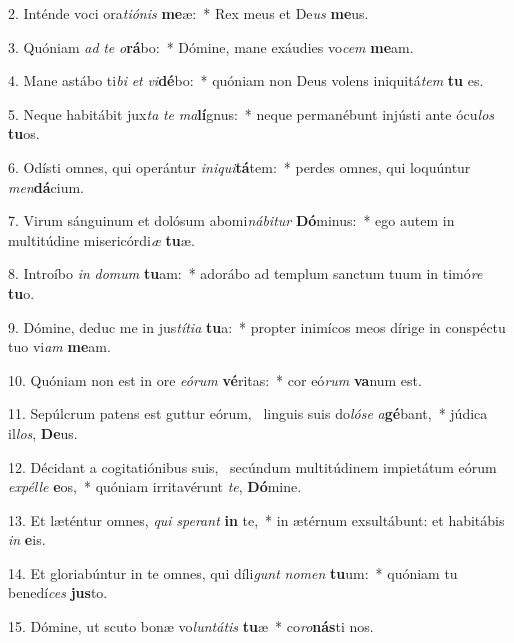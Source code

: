 2. Inténde voci ora\textit{ti}\textit{ó}\textit{nis} \textbf{me}æ:~*  Rex meus et De\textit{us} \textbf{me}us.\

3. Quóniam \textit{ad} \textit{te} \textit{o}\textbf{rá}bo:~*  Dómine, mane exáudies vo\textit{cem} \textbf{me}am.\

4. Mane astábo ti\textit{bi} \textit{et} \textit{vi}\textbf{dé}bo:~*  quóniam non Deus volens iniquitá\textit{tem} \textbf{tu} es.\

5. Neque habitábit jux\textit{ta} \textit{te} \textit{ma}\textbf{lí}gnus:~*  neque permanébunt injústi ante ócu\textit{los} \textbf{tu}os.\

6. Odísti omnes, qui operántur \textit{in}\textit{i}\textit{qui}\textbf{tá}tem:~*  perdes omnes, qui loquúntur \textit{men}\textbf{dá}cium.\

7. Virum sánguinum et dolósum abomi\textit{ná}\textit{bi}\textit{tur} \textbf{Dó}minus:~*  ego autem in multitúdine misericórdi\textit{æ} \textbf{tu}æ.\

8. Introíbo \textit{in} \textit{do}\textit{mum} \textbf{tu}am:~*  adorábo ad templum sanctum tuum in timó\textit{re} \textbf{tu}o.\

9. Dómine, deduc me in jus\textit{tí}\textit{ti}\textit{a} \textbf{tu}a:~*  propter inimícos meos dírige in conspéctu tuo vi\textit{am} \textbf{me}am.\

10. Quóniam non est in ore \textit{e}\textit{ó}\textit{rum} \textbf{vé}ritas:~*  cor eó\textit{rum} \textbf{va}num est.\

11. Sepúlcrum patens est guttur eórum, \dag\  linguis suis do\textit{ló}\textit{se} \textit{a}\textbf{gé}bant,~*  júdica il\textit{los}, \textbf{De}us.\

12. Décidant a cogitatiónibus suis, \dag\  secúndum multitúdinem impietátum eórum \textit{ex}\textit{pél}\textit{le} \textbf{e}os,~*  quóniam irritavérunt \textit{te}, \textbf{Dó}mine.\

13. Et læténtur omnes, \textit{qui} \textit{spe}\textit{rant} \textbf{in} te,~*  in ætérnum exsultábunt: et habitábis \textit{in} \textbf{e}is.\

14. Et gloriabúntur in te omnes, qui díli\textit{gunt} \textit{no}\textit{men} \textbf{tu}um:~*  quóniam tu benedí\textit{ces} \textbf{jus}to.\

15. Dómine, ut scuto bonæ vo\textit{lun}\textit{tá}\textit{tis} \textbf{tu}æ~*  co\textit{ro}\textbf{nás}ti nos.\

